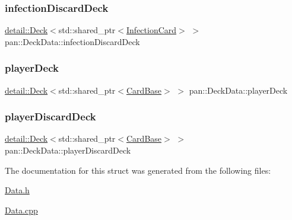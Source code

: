 \mbox{\label{structpan_1_1_deck_data_a0fd37772f6ccbf2ed921915fe4509d58}} 
\subsubsection{\texorpdfstring{infection\+Discard\+Deck}{infectionDiscardDeck}}
{\footnotesize\ttfamily \hyperlink{classpan_1_1detail_1_1_deck}{detail\+::\+Deck}$<$std\+::shared\+\_\+ptr$<$\hyperlink{namespacepan_ad7a96d727f36749dbd39428e2a007de5}{Infection\+Card}$>$ $>$ pan\+::\+Deck\+Data\+::infection\+Discard\+Deck}

\mbox{\label{structpan_1_1_deck_data_ae1a02cb510f149dd136faa38f1c99fc9}} 
\subsubsection{\texorpdfstring{player\+Deck}{playerDeck}}
{\footnotesize\ttfamily \hyperlink{classpan_1_1detail_1_1_deck}{detail\+::\+Deck}$<$std\+::shared\+\_\+ptr$<$\hyperlink{classpan_1_1_card_base}{Card\+Base}$>$ $>$ pan\+::\+Deck\+Data\+::player\+Deck}

\mbox{\label{structpan_1_1_deck_data_a7abb11d23c4f8b4a4bd689d8f3780acc}} 
\subsubsection{\texorpdfstring{player\+Discard\+Deck}{playerDiscardDeck}}
{\footnotesize\ttfamily \hyperlink{classpan_1_1detail_1_1_deck}{detail\+::\+Deck}$<$std\+::shared\+\_\+ptr$<$\hyperlink{classpan_1_1_card_base}{Card\+Base}$>$ $>$ pan\+::\+Deck\+Data\+::player\+Discard\+Deck}



The documentation for this struct was generated from the following files\+:\begin{DoxyCompactItemize}
\item 
\hyperlink{_data_8h}{Data.\+h}\item 
\hyperlink{_data_8cpp}{Data.\+cpp}\end{DoxyCompactItemize}
